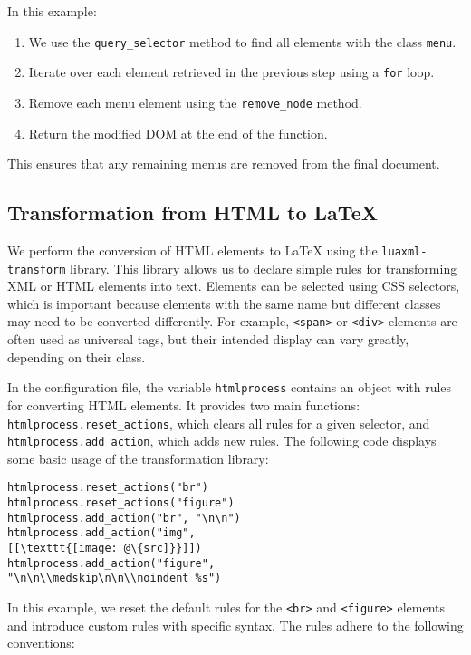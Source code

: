 \documentclass{ltugboat}
\begin{document}
In this example:

\begin{enumerate}
  \item We use the \texttt{query\_selector} method to find all elements with
    the class \texttt{menu}.
  \item Iterate over each element retrieved in the previous step
    using a \texttt{for} loop.
  \item Remove each menu element using the \texttt{remove\_node} method.
  \item Return the modified DOM at the end of the function.
\end{enumerate}

This ensures that any remaining menus are removed from the final document.

\subsection{Transformation from HTML to \LaTeX}

We perform the conversion of HTML elements to LaTeX using the
\texttt{luaxml-transform} library. This library allows us to declare simple
rules for transforming XML or HTML elements into text. Elements can be selected
using CSS selectors, which is important because elements with the same name but
different classes may need to be converted differently. For example,
\verb|<span>| or \verb|<div>| elements are often used as universal tags, but
their intended display can vary greatly, depending on their class.

In the configuration file, the variable \texttt{htmlprocess} contains an object with
rules for converting HTML elements. It provides two main functions:
\texttt{htmlprocess.reset\_actions}, which clears all rules for a given selector, and
\texttt{htmlprocess.add\_action}, which adds new rules.
The following code displays some basic usage of the transformation library:

\begin{verbatim}
htmlprocess.reset_actions("br")
htmlprocess.reset_actions("figure")
htmlprocess.add_action("br", "\n\n")
htmlprocess.add_action("img", 
[[\texttt{[image: @\{src]}}]])
htmlprocess.add_action("figure", 
"\n\n\\medskip\n\n\\noindent %s")
\end{verbatim}

In this example, we reset the default rules for the \verb|<br>| and
\verb|<figure>| elements and introduce custom rules with specific syntax. The
rules adhere to the following conventions:
\end{document}
